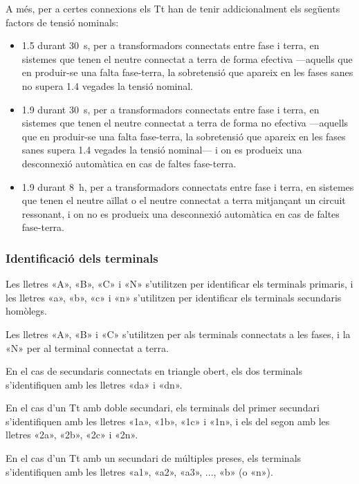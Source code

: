 A més, per a certes connexions els Tt han de tenir addicionalment els següents factors de tensió nominals:
 \begin{itemize}
   \item \num{1,5} durant \qty{30}{s},  per a transformadors connectats entre fase i terra, en sistemes que tenen el neutre connectat a terra de forma efectiva ---aquells que en produir-se una falta fase-terra, la sobretensió que apareix en les fases sanes no supera \num{1,4} vegades la tensió nominal.
   \item \num{1,9} durant \qty{30}{s},  per a transformadors connectats entre fase i terra, en sistemes que tenen el neutre connectat a terra de forma no efectiva ---aquells que en produir-se una falta fase-terra, la sobretensió que apareix en les fases sanes  supera \num{1,4} vegades la tensió nominal--- i on es produeix una desconnexió automàtica  en cas de faltes fase-terra.
   \item \num{1,9} durant \qty{8}{h},  per a transformadors connectats entre fase i terra, en sistemes que tenen el neutre aïllat o el neutre connectat a terra mitjançant un circuit ressonant, i on no es produeix una desconnexió automàtica  en cas de faltes fase-terra.
\end{itemize}

\subsubsection{Identificació dels terminals}

 Les lletres «A», «B», «C» i «N» s'utilitzen per identificar els terminals primaris, i les lletres «a», «b», «c» i «n» s'utilitzen per identificar els terminals secundaris homòlegs.

 Les lletres «A», «B» i «C» s'utilitzen per als terminals connectats a les fases, i la «N» per al terminal connectat a terra.

 En el cas de secundaris connectats en triangle obert, els dos terminals s'identifiquen amb les lletres «da» i «dn».

 En el cas d'un Tt amb doble secundari, els terminals del  primer secundari s'identifiquen amb les lletres  «1a», «1b», «1c» i «1n», i els del segon amb les lletres  «2a», «2b», «2c» i «2n».

 En el cas d'un Tt amb un  secundari de  múltiples preses, els terminals s'identifiquen amb les lletres  «a1», «a2», «a3», ..., «b» (o «n»).


